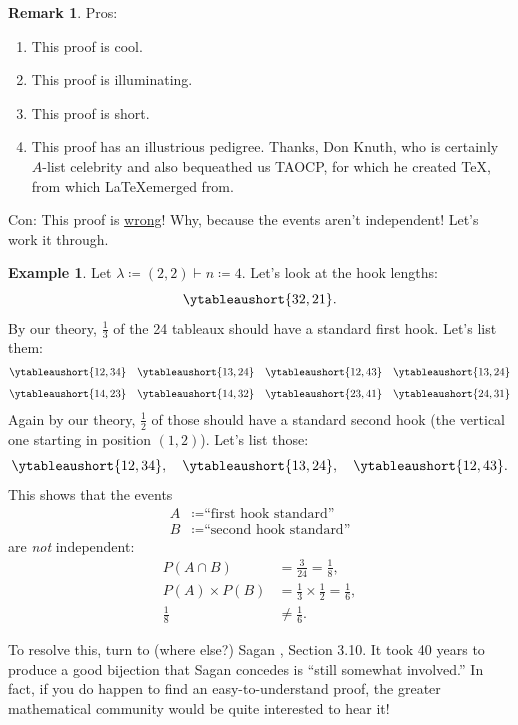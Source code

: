 \documentclass[12pt]{article}
\newcommand{\ita}[1]{\textit{#1}}
\theoremstyle{definition}
\newtheorem*{remark}{Remark}
\newtheorem{example}{Example}[section]
\begin{document}
\begin{remark}
    Pros:
    \begin{enumerate}
        \item This proof is cool.
        \item This proof is illuminating.
        \item This proof is short.
        \item This proof has an illustrious pedigree. Thanks, Don Knuth, who is certainly $A$-list celebrity and also bequeathed us TAOCP, for which he created TeX, from which \LaTeX emerged from.
    \end{enumerate}
    Con: This proof is \underline{wrong}! Why, because the events aren't independent! Let's work it through.
\end{remark}
\begin{example}
    Let $\lambda \coloneqq  (2,2) \vdash n\coloneqq  4$. Let's look at the hook lengths:
    \begin{equation*}
        \ytableaushort{32,21}.
    \end{equation*}
    By our theory, $\frac{1}{3}$ of the 24 tableaux should have a standard first hook. Let's list them:
    \begin{align*}
        \ytableaushort{12,34} & \quad \ytableaushort{13,24} \quad \ytableaushort{12,43} \quad \ytableaushort{13,24} \\[0.5em]
        \ytableaushort{14,23} & \quad \ytableaushort{14,32} \quad \ytableaushort{23,41} \quad \ytableaushort{24,31}
    \end{align*}
    Again by our theory, $\frac{1}{2}$ of those should have a standard second hook (the vertical one starting in position $(1,2)$). Let's list those:
    \begin{equation*}
        \ytableaushort{12,34}, \quad \ytableaushort{13,24}, \quad \ytableaushort{12,43}.
    \end{equation*}
    This shows that the events
    \begin{align*}
        A & \coloneqq  \text{``first hook standard''} \\
        B & \coloneqq  \text{``second hook standard''}
    \end{align*}
    are \ita{not} independent:
    \begin{align*}
        P(A \cap B) & = \frac{3}{24} = \frac{1}{8}, \\
        P(A) \times P(B) & = \frac{1}{3} \times \frac{1}{2} = \frac{1}{6}, \\
        \frac{1}{8} & \neq \frac{1}{6}.
    \end{align*}
\end{example}
To resolve this, turn to (where else?) Sagan \cite{Sagan}, Section 3.10. It took 40 years to produce a good bijection that Sagan concedes is ``still somewhat involved.'' In fact, if you do happen to find an easy-to-understand proof, the greater mathematical community would be quite interested to hear it!
\newpage
\end{document}
